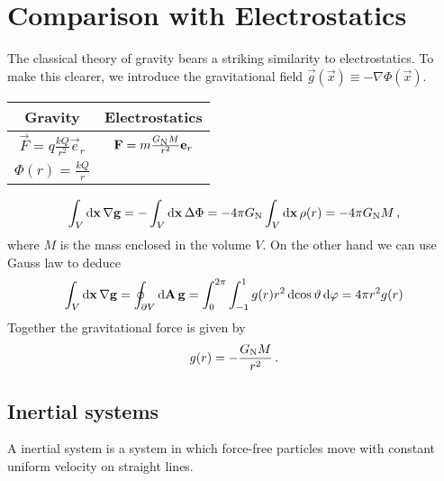 \section{Comparison with Electrostatics}
The classical theory of gravity bears a striking similarity to electrostatics. To make this clearer, we introduce the gravitational field $\vec{g}(\vec{x})\equiv -\nabla\Phi(\vec{x})$.
\begin{table}
    \centering
    \begin{tabular}{cc}
        \toprule
        Gravity&Electrostatics\\
        \midrule
        $\displaystyle\vec{F}=q\frac{kQ}{r^2}\vec{e}_r$&$\vec{F}=m\frac{G\textsubscript{N}M}{r^2}\vec{e}_r$\\
        $\Phi(r)=\frac{kQ}{r}$&\\
        \bottomrule
    \end{tabular}
\end{table}
\begin{example}
\begin{equation}
    \int_V\dif{\vec{x}}\, \nabla\vec{g}=-\int_V\dif{\vec{x}}\, \Delta\Phi = -4\pi G\textsubscript{N}\int_V\dif{\vec{x}}\,\rho(r)= -4\pi G\textsubscript{N} M\, ,
\end{equation}
where $M$ is the mass enclosed in the volume $V$. On the other hand we can use Gauss law to deduce
\begin{equation}
    \int_V\dif{\vec{x}}\, \nabla\vec{g}=\oint_{\partial V}\dif{\vec{A}}\, \vec{g} =\int_{0}^{2\pi}\int_{-1}^{1} g(r)r^2\dif{\cos\vartheta}\dif{\varphi}=4\pi r^2g(r)
\end{equation}
Together the gravitational force is given by
\begin{equation}
    g(r)=-\frac{G\textsubscript{N}M}{r^2}\, .
\end{equation}
\end{example}
\subsection*{Inertial systems}
A inertial system is a system in which force-free particles move with constant uniform velocity on straight lines.
